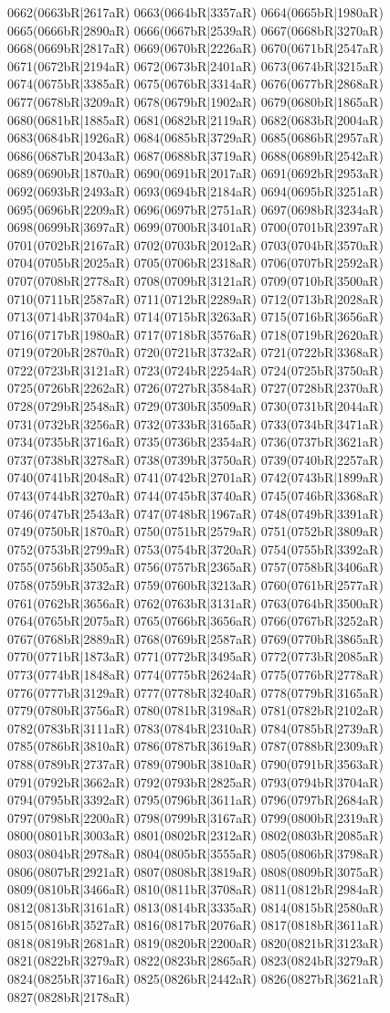 0662(0663bR|2617aR) 0663(0664bR|3357aR) 0664(0665bR|1980aR) 0665(0666bR|2890aR) 0666(0667bR|2539aR) 0667(0668bR|3270aR) 0668(0669bR|2817aR) 0669(0670bR|2226aR) 0670(0671bR|2547aR) 0671(0672bR|2194aR) 0672(0673bR|2401aR) 0673(0674bR|3215aR) 0674(0675bR|3385aR) 0675(0676bR|3314aR) 0676(0677bR|2868aR) 0677(0678bR|3209aR) 0678(0679bR|1902aR) 0679(0680bR|1865aR) 0680(0681bR|1885aR) 0681(0682bR|2119aR) 0682(0683bR|2004aR) 0683(0684bR|1926aR) 0684(0685bR|3729aR) 0685(0686bR|2957aR) 0686(0687bR|2043aR) 0687(0688bR|3719aR) 0688(0689bR|2542aR) 0689(0690bR|1870aR) 0690(0691bR|2017aR) 0691(0692bR|2953aR) 0692(0693bR|2493aR) 0693(0694bR|2184aR) 0694(0695bR|3251aR) 0695(0696bR|2209aR) 0696(0697bR|2751aR) 0697(0698bR|3234aR) 0698(0699bR|3697aR) 0699(0700bR|3401aR) 0700(0701bR|2397aR) 0701(0702bR|2167aR) 0702(0703bR|2012aR) 0703(0704bR|3570aR) 0704(0705bR|2025aR) 0705(0706bR|2318aR) 0706(0707bR|2592aR) 0707(0708bR|2778aR) 0708(0709bR|3121aR) 0709(0710bR|3500aR) 0710(0711bR|2587aR) 0711(0712bR|2289aR) 0712(0713bR|2028aR) 0713(0714bR|3704aR) 0714(0715bR|3263aR) 0715(0716bR|3656aR) 0716(0717bR|1980aR) 0717(0718bR|3576aR) 0718(0719bR|2620aR) 0719(0720bR|2870aR) 0720(0721bR|3732aR) 0721(0722bR|3368aR) 0722(0723bR|3121aR) 0723(0724bR|2254aR) 0724(0725bR|3750aR) 0725(0726bR|2262aR) 0726(0727bR|3584aR) 0727(0728bR|2370aR) 0728(0729bR|2548aR) 0729(0730bR|3509aR) 0730(0731bR|2044aR) 0731(0732bR|3256aR) 0732(0733bR|3165aR) 0733(0734bR|3471aR) 0734(0735bR|3716aR) 0735(0736bR|2354aR) 0736(0737bR|3621aR) 0737(0738bR|3278aR) 0738(0739bR|3750aR) 0739(0740bR|2257aR) 0740(0741bR|2048aR) 0741(0742bR|2701aR) 0742(0743bR|1899aR) 0743(0744bR|3270aR) 0744(0745bR|3740aR) 0745(0746bR|3368aR) 0746(0747bR|2543aR) 0747(0748bR|1967aR) 0748(0749bR|3391aR) 0749(0750bR|1870aR) 0750(0751bR|2579aR) 0751(0752bR|3809aR) 0752(0753bR|2799aR) 0753(0754bR|3720aR) 0754(0755bR|3392aR) 0755(0756bR|3505aR) 0756(0757bR|2365aR) 0757(0758bR|3406aR) 0758(0759bR|3732aR) 0759(0760bR|3213aR) 0760(0761bR|2577aR) 0761(0762bR|3656aR) 0762(0763bR|3131aR) 0763(0764bR|3500aR) 0764(0765bR|2075aR) 0765(0766bR|3656aR) 0766(0767bR|3252aR) 0767(0768bR|2889aR) 0768(0769bR|2587aR) 0769(0770bR|3865aR) 0770(0771bR|1873aR) 0771(0772bR|3495aR) 0772(0773bR|2085aR) 0773(0774bR|1848aR) 0774(0775bR|2624aR) 0775(0776bR|2778aR) 0776(0777bR|3129aR) 0777(0778bR|3240aR) 0778(0779bR|3165aR) 0779(0780bR|3756aR) 0780(0781bR|3198aR) 0781(0782bR|2102aR) 0782(0783bR|3111aR) 0783(0784bR|2310aR) 0784(0785bR|2739aR) 0785(0786bR|3810aR) 0786(0787bR|3619aR) 0787(0788bR|2309aR) 0788(0789bR|2737aR) 0789(0790bR|3810aR) 0790(0791bR|3563aR) 0791(0792bR|3662aR) 0792(0793bR|2825aR) 0793(0794bR|3704aR) 0794(0795bR|3392aR) 0795(0796bR|3611aR) 0796(0797bR|2684aR) 0797(0798bR|2200aR) 0798(0799bR|3167aR) 0799(0800bR|2319aR) 0800(0801bR|3003aR) 0801(0802bR|2312aR) 0802(0803bR|2085aR) 0803(0804bR|2978aR) 0804(0805bR|3555aR) 0805(0806bR|3798aR) 0806(0807bR|2921aR) 0807(0808bR|3819aR) 0808(0809bR|3075aR) 0809(0810bR|3466aR) 0810(0811bR|3708aR) 0811(0812bR|2984aR) 0812(0813bR|3161aR) 0813(0814bR|3335aR) 0814(0815bR|2580aR) 0815(0816bR|3527aR) 0816(0817bR|2076aR) 0817(0818bR|3611aR) 0818(0819bR|2681aR) 0819(0820bR|2200aR) 0820(0821bR|3123aR) 0821(0822bR|3279aR) 0822(0823bR|2865aR) 0823(0824bR|3279aR) 0824(0825bR|3716aR) 0825(0826bR|2442aR) 0826(0827bR|3621aR) 0827(0828bR|2178aR) 